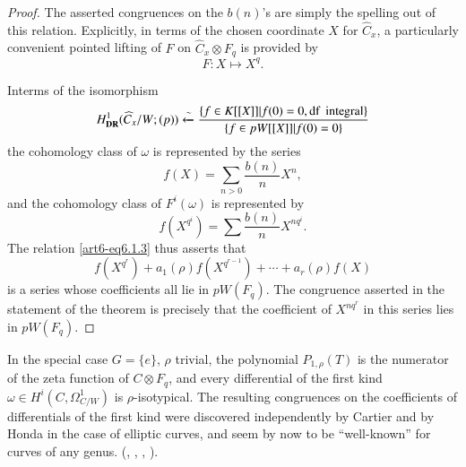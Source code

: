 \begin{proof}
The asserted congruences on the $b(n)$'s are simply the spelling out of this relation. Explicitly, in terms of the chosen coordinate $X$ for $\widehat{C}_{x}$, a particularly convenient pointed lifting of $F$ on $\widehat{C}_{x}\otimes F_{q}$ is provided by
$$
F:X\mapsto X^{q}.
$$

In\pageoriginale terms of the isomorphism
$$
H^{1}_{\mathbf{DR}}(\widehat{C}_{x}/W;(p))\xleftarrow{\sim}\frac{\{f\in K[[X]]|f(0)=0,\operatorname{df}\text{~integral}\}}{\{f\in pW[[X]]|f(0)=0\}}
$$
the cohomology class of $\omega$ is represented by the series
$$
f(X)=\sum\limits_{n>0}\frac{b(n)}{n}X^{n},
$$
and the cohomology class of $F^{i}(\omega)$ is represented by
$$
f(X^{q^{i}})=\sum \frac{b(n)}{n}X^{nq^{i}}.
$$
The relation \eqref{art6-eq6.1.3} thus asserts that
$$
f(X^{q^{r}})+a_{1}(\rho)f(X^{q^{r-1}})+\cdots+a_{r}(\rho)f(X)
$$
is a series whose coefficients all lie in $pW(F_{q})$. The congruence asserted in the statement of the theorem is precisely that the coefficient of $X^{nq^{r}}$ in this series lies in $pW(F_{q})$.
\end{proof}

\begin{remark*}
In the special case $G=\{e\}$, $\rho$ trivial, the polynomial $P_{1,\rho}(T)$ is the numerator of the zeta function of $C\otimes F_{q}$, and every differential of the first kind $\omega\in H^{i}(C,\Omega^{1}_{C/W})$ is $\rho$-isotypical. The resulting congruences on the coefficients of differentials of the first kind were discovered independently by Cartier and by Honda in the case of elliptic curves, and seem by now to be ``well-known'' for curves of any genus. (\cite{art6-key1}, \cite{art6-key5}, \cite{art6-key8}, \cite{art6-key22}).
\end{remark*}

